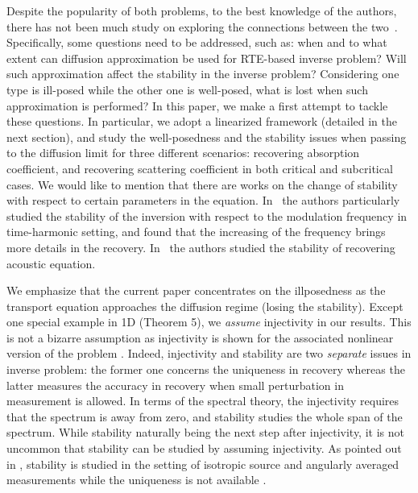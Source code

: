\documentclass[english,reqno]{amsart}
\theoremstyle{plain}
\theoremstyle{definition} %
\begin{document}
Despite the popularity of both problems, to the best knowledge of the authors, there has not been much study on exploring the connections between the two~\cite{Arridge_Schotland09}. Specifically, some questions need to be addressed, such as: when and to what extent can diffusion approximation be used for RTE-based inverse problem? Will such approximation affect the stability in the inverse problem? Considering one type is ill-posed while the other one is well-posed, what is lost when such approximation is performed? In this paper, we make a first attempt to tackle these questions. In particular, we adopt a linearized framework (detailed in the next section), and study the well-posedness and the stability issues when passing to the diffusion limit for three different scenarios: recovering absorption coefficient, and recovering scattering coefficient in both critical and subcritical cases. We would like to mention that there are works on the change of stability with respect to certain parameters in the equation. In~\cite{time_harmonic,BalMonard_time_harmonic} the authors particularly studied the stability of the inversion with respect to the modulation frequency in time-harmonic setting, and found that the increasing of the frequency brings more details in the recovery. In~\cite{Uhlmann_stability_acoustic} the authors studied the stability of recovering acoustic equation.

We emphasize that the current paper concentrates on the illposedness as the transport equation approaches the diffusion regime (losing the stability). Except one special example in 1D (Theorem 5), we {\it assume} injectivity in our results. This is not a bizarre assumption as injectivity is shown for the associated nonlinear version of the problem \cite{ChoulliStefenov}. Indeed, injectivity and stability are two {\it separate} issues in inverse problem: the former one concerns the uniqueness in recovery whereas the latter measures the accuracy in recovery when small perturbation in measurement is allowed. In terms of the spectral theory, the injectivity requires that the spectrum is away from zero, and stability studies the whole span of the spectrum. While stability naturally being the next step after injectivity, it is not uncommon that stability can be studied by assuming injectivity. As pointed out in \cite{Bal_review}, stability is studied in the setting of isotropic source and angularly averaged measurements while the uniqueness is not available \cite{Bal08,time_harmonic,BalMonard_time_harmonic}.   
\end{document}
